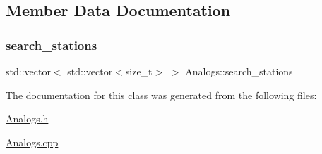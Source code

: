 \subsection{Member Data Documentation}
\mbox{\label{class_analogs_a32cff6e74cb1c15dc7fd769ab9835bca}} 
\subsubsection{\texorpdfstring{search\+\_\+stations}{search\_stations}}
{\footnotesize\ttfamily std\+::vector$<$ std\+::vector$<$size\+\_\+t$>$ $>$ Analogs\+::search\+\_\+stations}



The documentation for this class was generated from the following files\+:\begin{DoxyCompactItemize}
\item 
\mbox{\hyperlink{_analogs_8h}{Analogs.\+h}}\item 
\mbox{\hyperlink{_analogs_8cpp}{Analogs.\+cpp}}\end{DoxyCompactItemize}
